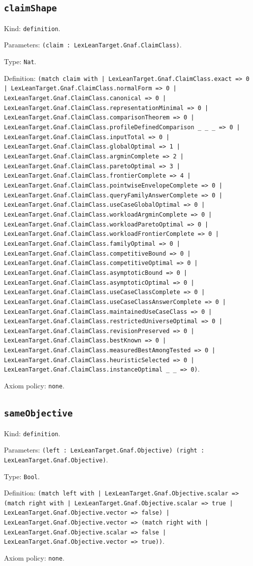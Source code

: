 \documentclass[11pt]{article}
\begin{document}
\subsection*{\texttt{claimShape}}
\noindent Kind: \texttt{definition}.\par
\noindent Parameters: \texttt{(claim : LexLeanTarget.Gnaf.ClaimClass)}.\par
\noindent Type: \texttt{Nat}.\par
\noindent Definition: \texttt{(match claim with | LexLeanTarget.Gnaf.ClaimClass.exact => 0 | LexLeanTarget.Gnaf.ClaimClass.normalForm => 0 | LexLeanTarget.Gnaf.ClaimClass.canonical => 0 | LexLeanTarget.Gnaf.ClaimClass.representationMinimal => 0 | LexLeanTarget.Gnaf.ClaimClass.comparisonTheorem => 0 | LexLeanTarget.Gnaf.ClaimClass.profileDefinedComparison \_ \_ \_ => 0 | LexLeanTarget.Gnaf.ClaimClass.inputTotal => 0 | LexLeanTarget.Gnaf.ClaimClass.globalOptimal => 1 | LexLeanTarget.Gnaf.ClaimClass.argminComplete => 2 | LexLeanTarget.Gnaf.ClaimClass.paretoOptimal => 3 | LexLeanTarget.Gnaf.ClaimClass.frontierComplete => 4 | LexLeanTarget.Gnaf.ClaimClass.pointwiseEnvelopeComplete => 0 | LexLeanTarget.Gnaf.ClaimClass.queryFamilyAnswerComplete => 0 | LexLeanTarget.Gnaf.ClaimClass.useCaseGlobalOptimal => 0 | LexLeanTarget.Gnaf.ClaimClass.workloadArgminComplete => 0 | LexLeanTarget.Gnaf.ClaimClass.workloadParetoOptimal => 0 | LexLeanTarget.Gnaf.ClaimClass.workloadFrontierComplete => 0 | LexLeanTarget.Gnaf.ClaimClass.familyOptimal => 0 | LexLeanTarget.Gnaf.ClaimClass.competitiveBound => 0 | LexLeanTarget.Gnaf.ClaimClass.competitiveOptimal => 0 | LexLeanTarget.Gnaf.ClaimClass.asymptoticBound => 0 | LexLeanTarget.Gnaf.ClaimClass.asymptoticOptimal => 0 | LexLeanTarget.Gnaf.ClaimClass.useCaseClassComplete => 0 | LexLeanTarget.Gnaf.ClaimClass.useCaseClassAnswerComplete => 0 | LexLeanTarget.Gnaf.ClaimClass.maintainedUseCaseClass => 0 | LexLeanTarget.Gnaf.ClaimClass.restrictedUniverseOptimal => 0 | LexLeanTarget.Gnaf.ClaimClass.revisionPreserved => 0 | LexLeanTarget.Gnaf.ClaimClass.bestKnown => 0 | LexLeanTarget.Gnaf.ClaimClass.measuredBestAmongTested => 0 | LexLeanTarget.Gnaf.ClaimClass.heuristicSelected => 0 | LexLeanTarget.Gnaf.ClaimClass.instanceOptimal \_ \_ => 0)}.\par
\noindent Axiom policy: \texttt{none}.\par
\subsection*{\texttt{sameObjective}}
\noindent Kind: \texttt{definition}.\par
\noindent Parameters: \texttt{(left : LexLeanTarget.Gnaf.Objective) (right : LexLeanTarget.Gnaf.Objective)}.\par
\noindent Type: \texttt{Bool}.\par
\noindent Definition: \texttt{(match left with | LexLeanTarget.Gnaf.Objective.scalar => (match right with | LexLeanTarget.Gnaf.Objective.scalar => true | LexLeanTarget.Gnaf.Objective.vector => false) | LexLeanTarget.Gnaf.Objective.vector => (match right with | LexLeanTarget.Gnaf.Objective.scalar => false | LexLeanTarget.Gnaf.Objective.vector => true))}.\par
\noindent Axiom policy: \texttt{none}.\par
\end{document}
